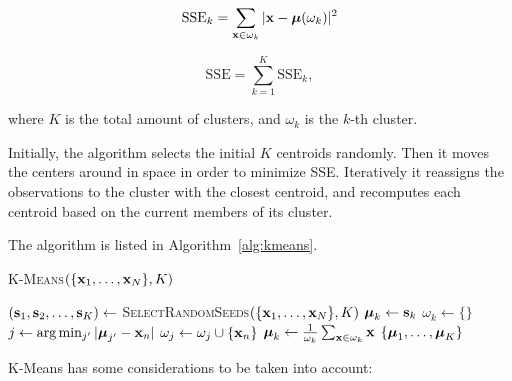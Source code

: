 $$ \text{SSE}_k = \sum_{\boldsymbol{\mathbf{x}} \in \omega_k} |\boldsymbol{\mathbf{x}} - \boldsymbol{\mathbf{\mu}}(\omega_k)|^2 $$

$$ \text{SSE} = \sum_{k = 1}^K \text{SSE}_k, $$

where $K$ is the total amount of clusters, and $\omega_k$ is the $k$-th cluster.

Initially, the algorithm selects the initial $K$ centroids randomly.
%
Then it moves the centers around in space in order to minimize SSE.
%
Iteratively it reassigns the observations to the cluster with the closest
centroid, and recomputes each centroid based on the current members of its
cluster. 

The algorithm is listed in Algorithm~\ref{alg:kmeans}.

\begin{algorithm}
    \caption{{\scshape K-Means}$(\{\boldsymbol{\mathbf{x}}_1, \ldots, \boldsymbol{\mathbf{x}}_N\}, K)$}
    \label{alg:kmeans}
    \begin{algorithmic}[1]
        \STATE $(\boldsymbol{\mathbf{s}}_1, \boldsymbol{\mathbf{s}}_2, \ldots, \boldsymbol{\mathbf{s}}_K) \gets$ {\scshape SelectRandomSeeds}$(\{\boldsymbol{\mathbf{x}}_1, \ldots, \boldsymbol{\mathbf{x}}_N\}, K)$
         \STATE $\boldsymbol{\mathbf{\mu}}_k \gets \boldsymbol{\mathbf{s}}_k$ \ENDFOR
                \STATE $\omega_k \gets \{\}$
            \ENDFOR
                \STATE $j \gets \text{arg} \min_{j'} |\boldsymbol{\mathbf{\mu}}_{j'} - \boldsymbol{\mathbf{x}}_n|$
                \STATE $\omega_j \gets \omega_j \cup \{\boldsymbol{\mathbf{x}}_n\}$
            \ENDFOR
                \STATE $\boldsymbol{\mathbf{\mu}}_k \gets \frac{1}{\omega_k}\sum_{\boldsymbol{\mathbf{x}}\in\omega_k}\boldsymbol{\mathbf{x}}$
            \ENDFOR
        \ENDWHILE
        \RETURN $\{\boldsymbol{\mathbf{\mu}}_1, \ldots, \boldsymbol{\mathbf{\mu}}_K\}$
    \end{algorithmic}
\end{algorithm}

K-Means has some considerations to be taken into account:

